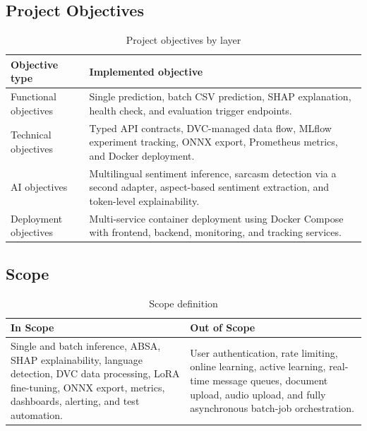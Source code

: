 \documentclass[12pt, a4paper]{article}
\begin{document}
\subsection{Project Objectives}
\begin{table}[H]
\centering
\caption{Project objectives by layer}
\begin{tabularx}{\textwidth}{@{} p{3.1cm} X @{}}
\toprule
\textbf{Objective type} & \textbf{Implemented objective} \\
\midrule
Functional objectives & Single prediction, batch CSV prediction, SHAP explanation, health check, and evaluation trigger endpoints. \\
Technical objectives & Typed API contracts, DVC-managed data flow, MLflow experiment tracking, ONNX export, Prometheus metrics, and Docker deployment. \\
AI objectives & Multilingual sentiment inference, sarcasm detection via a second adapter, aspect-based sentiment extraction, and token-level explainability. \\
Deployment objectives & Multi-service container deployment using Docker Compose with frontend, backend, monitoring, and tracking services. \\
\bottomrule
\end{tabularx}
\end{table}

\subsection{Scope}
\begin{table}[H]
\centering
\caption{Scope definition}
\begin{tabularx}{\textwidth}{@{} p{3cm} X @{}}
\toprule
\textbf{In Scope} & \textbf{Out of Scope} \\
\midrule
Single and batch inference, ABSA, SHAP explainability, language detection, DVC data processing, LoRA fine-tuning, ONNX export, metrics, dashboards, alerting, and test automation. & User authentication, rate limiting, online learning, active learning, real-time message queues, document upload, audio upload, and fully asynchronous batch-job orchestration. \\
\bottomrule
\end{tabularx}
\end{table}
\end{document}
